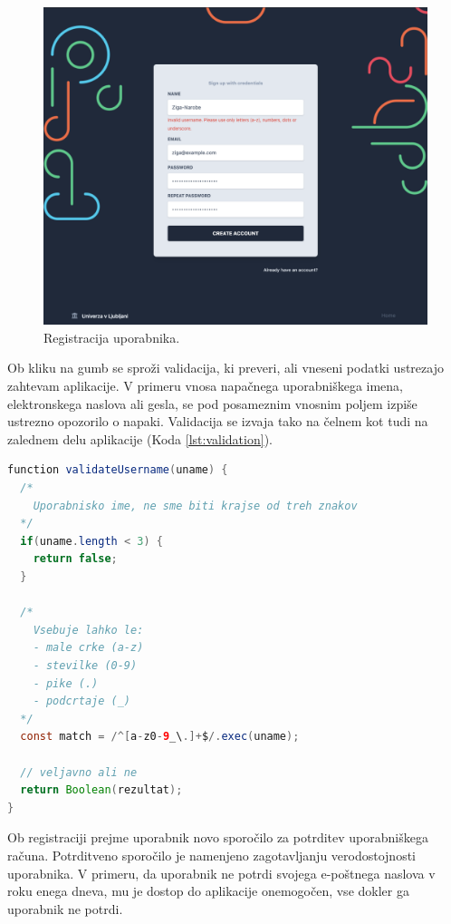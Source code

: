 \documentclass[a4paper, 12pt]{book}
\begin{document}
\begin{figure}[h]
\begin{center}
\includegraphics[width=1\textwidth]{slike/signup-validation.png}
\end{center}
\caption{ Registracija uporabnika. }
\label{signup-form}
\end{figure}

Ob kliku na gumb  se sproži validacija, ki preveri, ali vneseni podatki ustrezajo zahtevam aplikacije. V primeru vnosa napačnega uporabniškega imena, elektronskega naslova ali gesla, se pod posameznim vnosnim poljem izpiše ustrezno opozorilo o napaki. Validacija se izvaja tako na čelnem kot tudi na zalednem delu aplikacije (Koda \ref{lst:validation}). 


\begin{lstlisting}[language=java, style=mystyle,caption={Primer validacijske funkcije za preverjanje uporabniškega imena z uporabo regularnega izraza},label=lst:validation]
function validateUsername(uname) {
  /*
    Uporabnisko ime, ne sme biti krajse od treh znakov
  */
  if(uname.length < 3) {
    return false;
  }

  /* 
    Vsebuje lahko le: 
    - male crke (a-z) 
    - stevilke (0-9)
    - pike (.)
    - podcrtaje (_)
  */
  const match = /^[a-z0-9_\.]+$/.exec(uname);
  
  // veljavno ali ne
  return Boolean(rezultat);
}
\end{lstlisting}

Ob registraciji prejme uporabnik novo sporočilo za potrditev uporabniškega računa. Potrditveno sporočilo je namenjeno zagotavljanju verodostojnosti uporabnika. V primeru, da uporabnik ne potrdi svojega e-poštnega naslova v roku enega dneva, mu je dostop do aplikacije onemogočen, vse dokler ga uporabnik ne potrdi.
\end{document}
